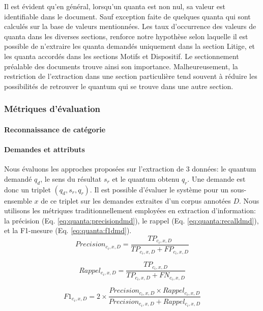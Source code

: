  Il est évident qu'en général, lorsqu'un quanta est non nul, sa valeur est identifiable dans le document. Sauf exception faite de quelques quanta qui sont calculés sur la base de valeurs mentionnées. Les taux d'occurrence des valeurs de quanta dans les diverses sections, renforce notre hypothèse selon laquelle il est possible de n'extraire les quanta demandés uniquement dans la section Litige, et les quanta accordés dans les sections Motifs et Dispositif. Le sectionnement préalable des documents trouve ainsi son importance. Malheureusement, la restriction de l'extraction dans une section particulière tend souvent à réduire les possibilités de retrouver le quantum qui se trouve dans une autre section. 

\subsubsection{Métriques d'évaluation}
\paragraph{Reconnaissance de catégorie}

\paragraph{Demandes et attributs}
 Nous évaluons les approches proposées sur l'extraction de 3 données: le quantum demandé $q_d$, le sens du résultat $s_r$ et le quantum obtenu $q_r$. Une demande est donc un triplet $(q_d, s_r, q_r)$. Il est possible d'évaluer le système pour un sous-ensemble $x$ de ce triplet sur les demandes extraites d'un corpus annotées $D$. Nous utilisons les métriques traditionnellement employées en extraction d'information: la précision (Eq. \ref{eq:quanta:precisiondmd}), le rappel (Eq. \ref{eq:quanta:recalldmd}), et la F1-mesure (Eq. \ref{eq:quanta:f1dmd}). 
 \begin{equation}
 Precision_{c_i,x,D} = \frac{TP_{c_i,x,D}}{TP_{c_i,x,D} + FP_{c_i,x,D}}  \label{eq:quanta:precisiondmd}
\end{equation}

\begin{equation}
Rappel_{c_i,x,D} = \frac{TP_{c_i,x,D}}{TP_{c_i,x,D} + FN_{c_i,x,D}} \label{eq:quanta:recalldmd}
\end{equation}

\begin{equation}
F1_{c_i,x,D} =2 \times \frac{Precision_{c_i,x,D} \times Rappel_{c_i,x,D}}{Precision_{c_i,x,D} + Rappel_{c_i,x,D}} \label{eq:quanta:f1dmd}
\end{equation}

